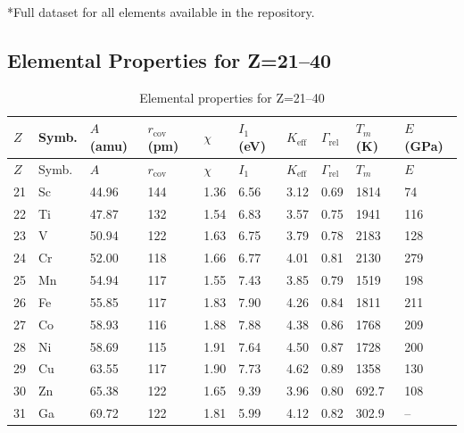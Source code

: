 \documentclass[12pt,a4paper]{article}
\newcommand{\Keff}{K_{\mathrm{eff}}}
\begin{document}
	\vspace{0.2cm}
	*Full dataset for all elements available in the repository.
	
	\subsection*{Elemental Properties for Z=21–40}
	
	\begin{longtable}{p{0.6cm}p{1.2cm}p{1.2cm}p{1.2cm}p{1.2cm}p{1.2cm}p{1.5cm}p{1.2cm}p{1.2cm}p{1.2cm}}
		\caption{Elemental properties for Z=21–40} \label{tab:elem-data-21to40} \\
		\toprule
		\(Z\) & Symb. & \(A\) (amu) & \(r_{\text{cov}}\) (pm) & \(\chi\) & \(I_1\) (eV) & \(\Keff\) & \(\Gamma_{\text{rel}}\) & \(T_m\) (K) & \(E\) (GPa) \\
		\midrule
		\endfirsthead
		\toprule
		\(Z\) & Symb. & \(A\) & \(r_{\text{cov}}\) & \(\chi\) & \(I_1\) & \(\Keff\) & \(\Gamma_{\text{rel}}\) & \(T_m\) & \(E\) \\
		\midrule
		\endhead
		21 & Sc & 44.96 & 144 & 1.36 & 6.56 & 3.12 & 0.69 & 1814 & 74 \\
		22 & Ti & 47.87 & 132 & 1.54 & 6.83 & 3.57 & 0.75 & 1941 & 116 \\
		23 & V  & 50.94 & 122 & 1.63 & 6.75 & 3.79 & 0.78 & 2183 & 128 \\
		24 & Cr & 52.00 & 118 & 1.66 & 6.77 & 4.01 & 0.81 & 2130 & 279 \\
		25 & Mn & 54.94 & 117 & 1.55 & 7.43 & 3.85 & 0.79 & 1519 & 198 \\
		26 & Fe & 55.85 & 117 & 1.83 & 7.90 & 4.26 & 0.84 & 1811 & 211 \\
		27 & Co & 58.93 & 116 & 1.88 & 7.88 & 4.38 & 0.86 & 1768 & 209 \\
		28 & Ni & 58.69 & 115 & 1.91 & 7.64 & 4.50 & 0.87 & 1728 & 200 \\
		29 & Cu & 63.55 & 117 & 1.90 & 7.73 & 4.62 & 0.89 & 1358 & 130 \\
		30 & Zn & 65.38 & 122 & 1.65 & 9.39 & 3.96 & 0.80 & 692.7 & 108 \\
		31 & Ga & 69.72 & 122 & 1.81 & 5.99 & 4.12 & 0.82 & 302.9 & – \\

\end{longtable}
\end{document}
